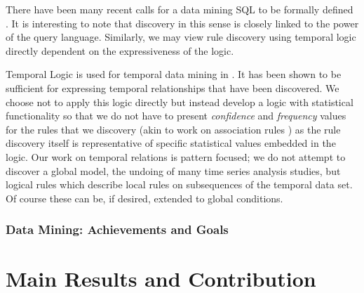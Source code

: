 \medskip

There have been many recent calls for a data mining SQL to be formally
defined \cite{im96}. It is interesting to note that discovery in this
sense is closely linked to the power of the query language. Similarly,
we may view rule discovery using temporal logic directly dependent on
the expressiveness of the logic.

\medskip

Temporal Logic is used for temporal data mining in
\cite{pt96,bt98}. It has been shown to be sufficient for expressing
temporal relationships that have been discovered. We choose not to
apply this logic directly but instead develop a logic with statistical
functionality so that we do not have to present {\em confidence} and
{\em frequency} values for the rules that we discovery (akin to work
on association rules \cite{ais93,kmrtv94,hkmt95}) as the rule discovery
itself is representative of specific statistical values embedded in
the logic. Our work on temporal relations is pattern focused; we do
not attempt to discover a global model, the undoing of many time
series analysis studies, but logical rules which describe local rules
on subsequences of the temporal data set. Of course these can be, if
desired, extended to global conditions.


\subsubsection{Data Mining: Achievements and Goals}\label{subsec:goals}

\section{Main Results and Contribution}


